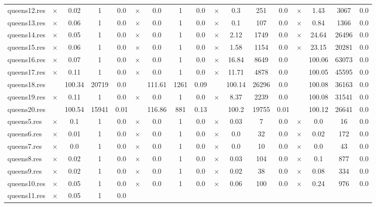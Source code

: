 \documentclass[main.tex]{subfiles}
\begin{document}
\begin{landscape}
\begin{center}
\begin{tabular}{lcccccccccccccccc}
queens12.res & $\times$ & 0.02 & 1 & 0.0
 & $\times$ & 0.0 & 1 & 0.0
 & $\times$ & 0.3 & 251 & 0.0
 & $\times$ & 1.43 & 3067 & 0.0
\\
queens13.res & $\times$ & 0.06 & 1 & 0.0
 & $\times$ & 0.0 & 1 & 0.0
 & $\times$ & 0.1 & 107 & 0.0
 & $\times$ & 0.84 & 1366 & 0.0
\\
queens14.res & $\times$ & 0.05 & 1 & 0.0
 & $\times$ & 0.0 & 1 & 0.0
 & $\times$ & 2.12 & 1749 & 0.0
 & $\times$ & 24.64 & 26496 & 0.0
\\
queens15.res & $\times$ & 0.06 & 1 & 0.0
 & $\times$ & 0.0 & 1 & 0.0
 & $\times$ & 1.58 & 1154 & 0.0
 & $\times$ & 23.15 & 20281 & 0.0
\\
queens16.res & $\times$ & 0.07 & 1 & 0.0
 & $\times$ & 0.0 & 1 & 0.0
 & $\times$ & 16.84 & 8649 & 0.0
 &  & 100.06 & 63073 & 0.0
\\
queens17.res & $\times$ & 0.11 & 1 & 0.0
 & $\times$ & 0.0 & 1 & 0.0
 & $\times$ & 11.71 & 4878 & 0.0
 &  & 100.05 & 45595 & 0.0
\\
queens18.res &  & 100.34 & 20719 & 0.0
 &  & 111.61 & 1261 & 0.09
 &  & 100.14 & 26296 & 0.0
 &  & 100.08 & 36163 & 0.0
\\
queens19.res & $\times$ & 0.11 & 1 & 0.0
 & $\times$ & 0.0 & 1 & 0.0
 & $\times$ & 8.37 & 2239 & 0.0
 &  & 100.08 & 31541 & 0.0
\\
queens20.res &  & 100.54 & 15941 & 0.01
 &  & 116.86 & 881 & 0.13
 &  & 100.2 & 19755 & 0.01
 &  & 100.12 & 26641 & 0.0
\\
queens5.res & $\times$ & 0.1 & 1 & 0.0
 & $\times$ & 0.0 & 1 & 0.0
 & $\times$ & 0.03 & 7 & 0.0
 & $\times$ & 0.0 & 16 & 0.0
\\
queens6.res & $\times$ & 0.01 & 1 & 0.0
 & $\times$ & 0.0 & 1 & 0.0
 & $\times$ & 0.0 & 32 & 0.0
 & $\times$ & 0.02 & 172 & 0.0
\\
queens7.res & $\times$ & 0.0 & 1 & 0.0
 & $\times$ & 0.0 & 1 & 0.0
 & $\times$ & 0.0 & 10 & 0.0
 & $\times$ & 0.0 & 43 & 0.0
\\
queens8.res & $\times$ & 0.02 & 1 & 0.0
 & $\times$ & 0.0 & 1 & 0.0
 & $\times$ & 0.03 & 104 & 0.0
 & $\times$ & 0.1 & 877 & 0.0
\\
queens9.res & $\times$ & 0.02 & 1 & 0.0
 & $\times$ & 0.0 & 1 & 0.0
 & $\times$ & 0.02 & 38 & 0.0
 & $\times$ & 0.08 & 334 & 0.0
\\
queens10.res & $\times$ & 0.05 & 1 & 0.0
 & $\times$ & 0.0 & 1 & 0.0
 & $\times$ & 0.06 & 100 & 0.0
 & $\times$ & 0.24 & 976 & 0.0
\\
queens11.res & $\times$ & 0.05 & 1 & 0.0

\end{tabular}
\end{center}
\end{landscape}
\end{document}
